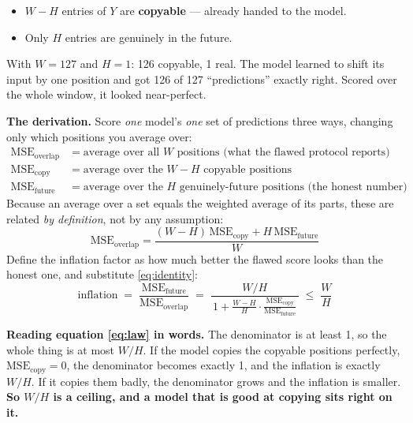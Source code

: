 \documentclass[11pt]{article}
\begin{document}
\begin{itemize}
\item $W - H$ entries of $Y$ are \textbf{copyable} --- already handed to the model.
\item Only $H$ entries are genuinely in the future.
\end{itemize}

With $W = 127$ and $H = 1$: 126 copyable, 1 real. The model learned to shift its
input by one position and got 126 of 127 ``predictions'' exactly right. Scored
over the whole window, it looked near-perfect.

\textbf{The derivation.} Score \emph{one} model's \emph{one} set of predictions
three ways, changing only which positions you average over:
\begin{align}
\mathrm{MSE}_{\text{overlap}} &= \text{average over all } W \text{ positions (what the flawed protocol reports)}\\
\mathrm{MSE}_{\text{copy}} &= \text{average over the } W-H \text{ copyable positions}\\
\mathrm{MSE}_{\text{future}} &= \text{average over the } H \text{ genuinely-future positions (the honest number)}
\end{align}
Because an average over a set equals the weighted average of its parts, these are
related \emph{by definition}, not by any assumption:
\begin{equation}
\mathrm{MSE}_{\text{overlap}}
= \frac{(W-H)\,\mathrm{MSE}_{\text{copy}} + H\,\mathrm{MSE}_{\text{future}}}{W}
\label{eq:identity}
\end{equation}
Define the inflation factor as how much better the flawed score looks than the
honest one, and substitute \eqref{eq:identity}:
\begin{equation}
\boxed{\;
\text{inflation} \;=\; \frac{\mathrm{MSE}_{\text{future}}}{\mathrm{MSE}_{\text{overlap}}}
\;=\;
\frac{W/H}{\,1 + \frac{W-H}{H}\cdot\frac{\mathrm{MSE}_{\text{copy}}}{\mathrm{MSE}_{\text{future}}}\,}
\;\le\; \frac{W}{H}\;}
\label{eq:law}
\end{equation}

\textbf{Reading equation \eqref{eq:law} in words.} The denominator is at least 1,
so the whole thing is at most $W/H$. If the model copies the copyable positions
perfectly, $\mathrm{MSE}_{\text{copy}} = 0$, the denominator becomes exactly 1, and
the inflation is exactly $W/H$. If it copies them badly, the denominator grows and
the inflation is smaller. \textbf{So $W/H$ is a ceiling, and a model that is good
at copying sits right on it.}
\end{document}
